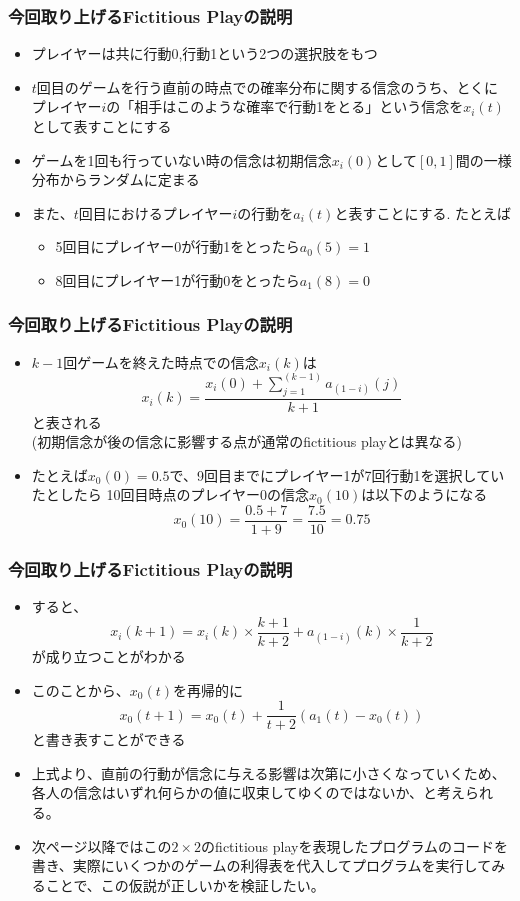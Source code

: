 \documentclass[dvipdfmx,fleqn,handout]{beamer}
\begin{document}
\begin{frame}
\frametitle{今回取り上げるFictitious Playの説明}
\begin{itemize}\setlength{\parskip}{0.5em}
\item
プレイヤーは共に行動0,行動1という2つの選択肢をもつ\pause
\item
$t$回目のゲームを行う直前の時点での確率分布に関する信念のうち、とくにプレイヤー$i$の「相手はこのような確率で行動1をとる」という信念を$x_i(t)$として表すことにする\pause
\item
ゲームを1回も行っていない時の信念は初期信念$x_i(0)$として$[0,1]$間の一様分布からランダムに定まる\pause
\item
また、$t$回目におけるプレイヤー$i$の行動を$a_i(t)$と表すことにする. たとえば
\begin{itemize}\setlength{\parskip}{0.5em}
\item5回目にプレイヤー0が行動1をとったら$a_0(5)=1$
\item8回目にプレイヤー1が行動0をとったら$a_1(8)=0$
\end{itemize}
\end{itemize}
\end{frame}

\begin{frame}
\frametitle{今回取り上げるFictitious Playの説明}
\begin{itemize}\setlength{\parskip}{0.5em}
\item
$k-1$回ゲームを終えた時点での信念$x_i(k)$は
\[
x_i(k)=\frac{x_i(0)+\sum_{j=1}^{(k-1)} a_{(1-i)}(j)}{k+1}
\]
と表される\\
(初期信念が後の信念に影響する点が通常のfictitious playとは異なる)\pause
\item
たとえば$x_0(0)=0.5$で、9回目までにプレイヤー1が7回行動1を選択していたとしたら
10回目時点のプレイヤー0の信念$x_0(10)$は以下のようになる
\[
x_0(10)=\frac{0.5+7}{1+9}=\frac{7.5}{10}=0.75
\]
\end{itemize}
\end{frame}

\begin{frame}
\frametitle{今回取り上げるFictitious Playの説明}
\begin{itemize}\setlength{\parskip}{0.5em}
\item
すると、
\[
x_i(k+1)=x_i(k)\times\frac{k+1}{k+2}+a_{(1-i)}(k)\times\frac{1}{k+2}
\]
が成り立つことがわかる\pause
\item
このことから、$x_0(t)$を再帰的に
\[
x_0(t+1)
= x_0(t) + \frac{1}{t+2} (a_1(t) - x_0(t))
\]
と書き表すことができる\pause
\item
上式より、直前の行動が信念に与える影響は次第に小さくなっていくため、各人の信念はいずれ何らかの値に収束してゆくのではないか、と考えられる。\pause
\item
次ページ以降ではこの$2\times2$のfictitious playを表現したプログラムのコードを書き、実際にいくつかのゲームの利得表を代入してプログラムを実行してみることで、この仮説が正しいかを検証したい。
\end{itemize}
\end{frame}
\end{document}
